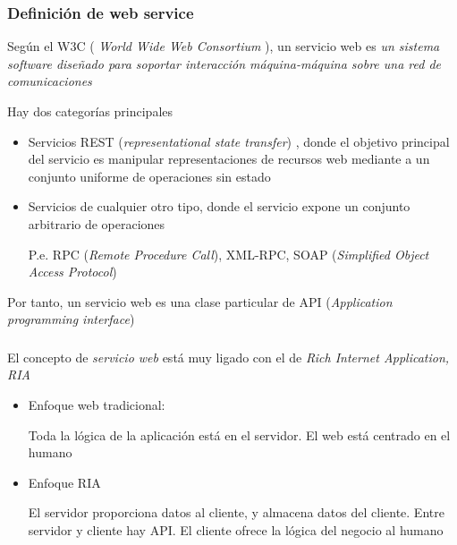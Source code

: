 \documentclass[ucs]{beamer}
\begin{document}
\begin{frame}[fragile]
\frametitle{Definición de web service}
Según el W3C (\emph{ World Wide Web Consortium }), un servicio web es 
\emph{un sistema software diseñado para soportar interacción máquina-máquina sobre una 
red de comunicaciones}

Hay dos categorías principales
\begin{itemize}
\item
Servicios REST (\emph{representational state transfer}) , donde el objetivo principal del servicio
es manipular representaciones de recursos web mediante a un conjunto uniforme de operaciones sin estado
\item
Servicios de cualquier otro tipo, donde el servicio expone un conjunto arbitrario de operaciones

P.e. RPC (\emph{Remote Procedure Call}), XML-RPC, SOAP (\emph{Simplified Object Access Protocol})

\end{itemize}
Por tanto, un servicio web es una clase particular de API (\emph{Application programming interface})

\end{frame}


\begin{frame}[fragile]
\frametitle{}
El concepto de \emph{servicio web} está muy ligado con el de \emph{Rich Internet Application, RIA}
\begin{itemize}
\item
Enfoque web tradicional:

Toda la lógica de la aplicación está en el servidor. El web está centrado en el humano
\item
Enfoque RIA

El servidor proporciona datos al cliente, y almacena datos del cliente. Entre servidor y cliente hay API. 
El cliente ofrece la lógica del negocio al humano
\end{itemize}


\end{frame}


%
%
\end{document}
